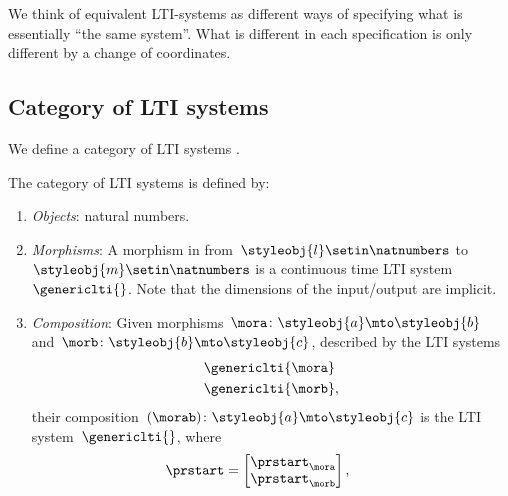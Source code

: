 We think of equivalent LTI-systems as different ways of specifying what is essentially ``the same system''.
What is different in each specification is only different by a change of coordinates.

\subsection{Category of LTI systems}

We define a category of LTI systems \LTI.

\begin{ctdefinition}
    \label{def:LTICat}
    The category \LTI of LTI systems is defined by:
    \begin{enumerate}
        \item \emph{Objects}: natural numbers.
        \item \emph{Morphisms}: A morphism in \LTI from~$\styleobj{l}\setin \natnumbers$ to~$\styleobj{m}\setin \natnumbers$ is a continuous time LTI system~$\genericlti{}$.
              Note that the dimensions of the input/output are implicit.
        \item \emph{Composition}: Given morphisms~$\mora \colon \styleobj{a}\mto \styleobj{b}$ and~$\morb\colon \styleobj{b}\mto \styleobj{c}$, described by the LTI systems
              \begin{equation}
                  \begin{aligned}
                       & \genericlti{\mora} \\
                       & \genericlti{\morb},
                  \end{aligned}
              \end{equation}
              their composition~$(\morab)\colon \styleobj{a}\mto \styleobj{c}$ is the LTI system~$\genericlti{}$, where
              \begin{equation}
                  \begin{aligned}
                      \prstart & =\begin{bmatrix}
                                      \prstart_\mora \\
                                      \prstart_\morb \\
                                  \end{bmatrix},\quad

\end{aligned}
\end{equation}
\end{enumerate}
\end{ctdefinition}
